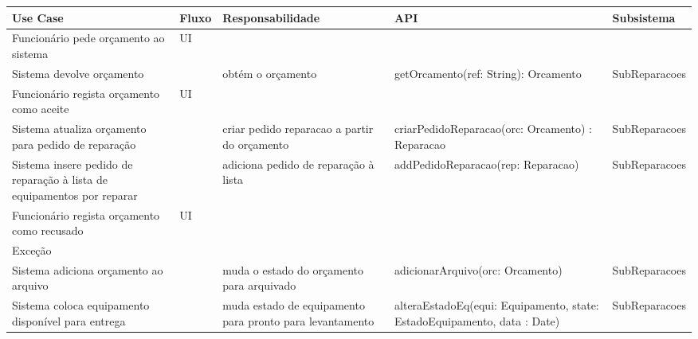 \documentclass[../relatorio.tex]{subfiles}
\begin{document}
\begin{landscape}
    \begin{table}[!h]
        \centering
        \begin{tabular}{|p{5cm}|p{1cm}|p{4cm}|p{6cm}|p{3cm}|}
            \hline
            \rowcolor{gray!20!white}
            Use Case & Fluxo                                            & Responsabilidade & API & Subsistema \\
            \hline
            \rowcolor{yellow}
            Funcionário pede orçamento ao sistema
                     & UI
                     & 
                     & 
                     & 
            \\
            \hline
            Sistema devolve orçamento
                     & 
                     & obtém o orçamento
                     & getOrcamento(ref: String): Orcamento
                     & SubReparacoes
            \\
            \hline
            \rowcolor{yellow}
            Funcionário regista orçamento como aceite
                     & UI
                     & 
                     & 
                     & 
            \\
            \hline
            Sistema atualiza orçamento para pedido de reparação
                     & 
                     & criar pedido reparacao a partir do orçamento
                     & criarPedidoReparacao(orc: Orcamento) : Reparacao
                     & SubReparacoes
            \\
            \hline
            Sistema insere pedido de reparação à lista de equipamentos por reparar
                     & 
                     & adiciona pedido de reparação à lista
                     & addPedidoReparacao(rep: Reparacao)
                     & SubReparacoes
            \\
            \hline
            \rowcolor{yellow}
            Funcionário regista orçamento como recusado
                     & UI
                     & 
                     & 
                     & 
            \\
            \hline
            \rowcolor{red!30}
            Exceção  &                                                  &                  &     &            \\
            \hline
            Sistema adiciona orçamento ao arquivo
                     & 
                     & muda o estado do orçamento para arquivado
                     & adicionarArquivo(orc: Orcamento)
                     & SubReparacoes
            \\
            \hline
            Sistema coloca equipamento disponível para entrega
                     & 
                     & muda estado de equipamento para pronto para levantamento
                     & alteraEstadoEq(equi: Equipamento, state: EstadoEquipamento, data : Date)
                     & SubReparacoes
            \\
            \hline
        \end{tabular}
    \end{table}
\end{landscape}
\end{document}
